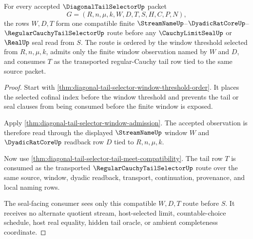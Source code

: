 \begin{theorem}
\label{thm:diagonal-tail-selector-window-dyadic-tail-compatibility}
For every accepted $\DiagonalTailSelectorUp$ packet
$$
G=(R,n,\mu,k,W,D,T,S,H,C,P,N),
$$
the rows $W,D,T$ form one compatible finite
$\StreamNameUp$--$\DyadicRatCoreUp$--$\RegularCauchyTailSelectorUp$ route
before any $\CauchyLimitSealUp$ or $\RealUp$ seal read from $S$. The route is
ordered by the window threshold selected from $R,n,\mu,k$, admits only the
finite window observation named by $W$ and $D$, and consumes $T$ as the
transported regular-Cauchy tail row tied to the same source packet.
\end{theorem}
\begin{proof}
Start with \autoref{thm:diagonal-tail-selector-window-threshold-order}. It
places the selected cofinal index before the window threshold and prevents the
tail or seal clauses from being consumed before the finite window is exposed.

Apply \autoref{thm:diagonal-tail-selector-window-admission}. The accepted
observation is therefore read through the displayed $\StreamNameUp$ window
$W$ and $\DyadicRatCoreUp$ readback row $D$ tied to $R,n,\mu,k$.

Now use \autoref{thm:diagonal-tail-selector-tail-meet-compatibility}. The
tail row $T$ is consumed as the transported
$\RegularCauchyTailSelectorUp$ route over the same source, window, dyadic
readback, transport, continuation, provenance, and local naming rows.

The seal-facing consumer sees only this compatible $W,D,T$ route before $S$.
It receives no alternate quotient stream, host-selected limit,
countable-choice schedule, host real equality, hidden tail oracle, or ambient
completeness coordinate.
\end{proof}

